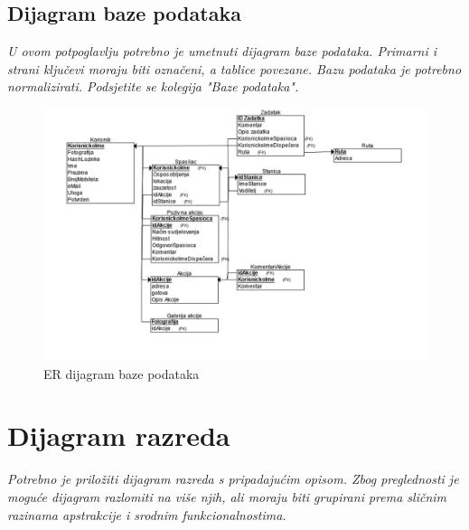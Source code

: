 				
			
			\subsection{Dijagram baze podataka}
				\textit{ U ovom potpoglavlju potrebno je umetnuti dijagram baze podataka. Primarni i strani ključevi moraju biti označeni, a tablice povezane. Bazu podataka je potrebno normalizirati. Podsjetite se kolegija "Baze podataka".}

				\begin{figure}[H]
					\includegraphics[scale=0.4]{slike/ModelBazePodataka.png} %
					\centering
					\caption{ER dijagram baze podataka}
					\label{fig:promjene}
				\end{figure}
			
			\eject
			
			
		\section{Dijagram razreda}
		
			\textit{Potrebno je priložiti dijagram razreda s pripadajućim opisom. Zbog preglednosti je moguće dijagram razlomiti na više njih, ali moraju biti grupirani prema sličnim razinama apstrakcije i srodnim funkcionalnostima.}\\
			
